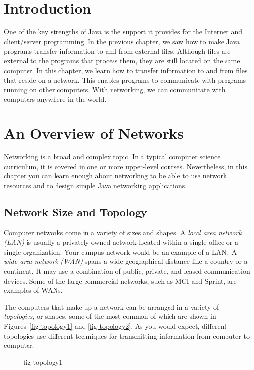 \section{Introduction}
\label{introduction}

One of the key strengths of Java is the support it provides for the
Internet and client/server programming.  In the previous chapter, we saw
how to make Java programs transfer information to and from external
files.  Although files are external to the programs that process them,
they are still located on the same computer.  In this chapter, we learn
how to transfer information to and from files that reside on a
network.  This enables programs to communicate with programs running on
other computers.   With networking, we can communicate with computers
anywhere in the world.  

\section{An Overview of Networks}
\label{an-overviewof-networks}
\noindent Networking is a broad and complex topic.  In a typical computer science
curriculum, it is covered in one or more upper-level
courses.  Nevertheless, in this chapter you can learn enough about
networking to be able to use network resources and to design simple
Java networking applications.

\subsection{Network Size and Topology}
\noindent Computer networks come in a variety of sizes and shapes.  A {\it local
area network (LAN)} is usually a privately owned network located
within a single office or a single organization.  Your campus
network would be an example of a LAN.~A {\it wide area
network (WAN)} spans a wide geographical distance like a country
or a continent.  It may use a combination of public, private,
and leased communication devices.  Some of the large commercial
networks, such as MCI and Sprint, are examples of WANs.

The computers that make up a network can be arranged in a variety of
{\it topologies}, or shapes, some of the most common of which are
shown in Figures~\ref{fig-topology1} and \ref{fig-topology2}. 
As you
would expect, different topologies use different techniques for
transmitting information from computer to computer.
\begin{figure}[h]
 {fig-topology1}
\end{figure}

